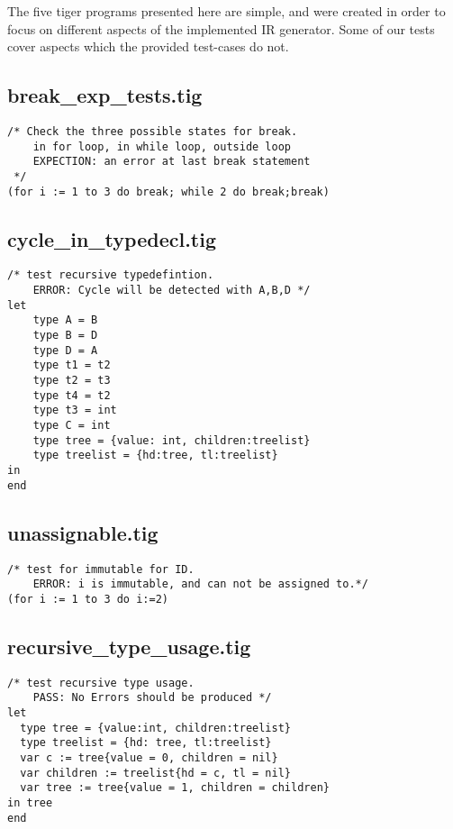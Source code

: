 \documentclass{article}
\begin{document}
The five tiger programs presented here are simple, and were created in order to focus on different aspects of the implemented IR generator. Some of our tests cover aspects which the provided test-cases do not.


\subsection{break\_exp\_tests.tig}

\begin{lstlisting}[frame=single]
/* Check the three possible states for break.
	in for loop, in while loop, outside loop
	EXPECTION: an error at last break statement
 */
(for i := 1 to 3 do break; while 2 do break;break)
\end{lstlisting}

\subsection{cycle\_in\_typedecl.tig}

\begin{lstlisting}[frame=single]
/* test recursive typedefintion.
	ERROR: Cycle will be detected with A,B,D */
let
	type A = B
	type B = D
	type D = A
	type t1 = t2
	type t2 = t3
	type t4 = t2
	type t3 = int
	type C = int
	type tree = {value: int, children:treelist}
	type treelist = {hd:tree, tl:treelist}
in 
end
\end{lstlisting}

\subsection{unassignable.tig}

\begin{lstlisting}[frame=single]
/* test for immutable for ID.
	ERROR: i is immutable, and can not be assigned to.*/
(for i := 1 to 3 do i:=2)
\end{lstlisting}

\subsection{recursive\_type\_usage.tig}

\begin{lstlisting}[frame=single]
 /* test recursive type usage.
	PASS: No Errors should be produced */
let
  type tree = {value:int, children:treelist}
  type treelist = {hd: tree, tl:treelist}
  var c := tree{value = 0, children = nil}
  var children := treelist{hd = c, tl = nil}
  var tree := tree{value = 1, children = children}
in tree
end
\end{lstlisting}
\end{document}
